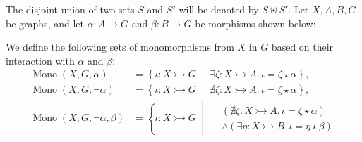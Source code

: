 \begin{notation}
    \label{subgraph_counting:notation:mono_sets}
 The disjoint union of two sets \( S \) and \( S' \) will be denoted by \( S \uplus S' \). Let \( X, A, B, G \) be graphs, and let \( \alpha \mathop{\colon} A \mathop{\to} G \) and \( \beta \mathop{\colon} B \mathop{\to} G \) be morphisms shown below:
\begin{center}
\end{center}
 We define the following sets of monomorphisms from $X$ in $G$ based on their interaction with $\alpha$ and $\beta$:    
    \begin{align*}
        \operatorname{Mono}(X,G,\alpha) &= \left\{ \iota \mathop{\colon} X \rightarrowtail G \;\middle|\; \exists \zeta \mathop{\colon} X \rightarrowtail A.\, \iota \mathop{=} \zeta \mathop{\star} \alpha \right\},
        \\
        \operatorname{Mono}(X,G,\lnot \alpha) &= \left\{ \iota \mathop{\colon} X \rightarrowtail G \;\middle|\; \nexists \zeta \mathop{\colon} X \rightarrowtail A.\, \iota \mathop{=} \zeta \mathop{\star} \alpha \right\},
        \\
        \operatorname{Mono}(X,G,\lnot \alpha, \beta) &= \left\{ 
            \iota \mathop{\colon} X \rightarrowtail G \;\middle|\; 
                \begin{aligned}  
                    &(\nexists \zeta \mathop{\colon} X \rightarrowtail A.\, \iota \mathop{=} \zeta \mathop{\star} \alpha) \\ 
                    &\land (\exists \eta \mathop{\colon} X \rightarrowtail B.\, \iota \mathop{=} \eta \mathop{\star} \beta)

\end{aligned}
\end{align*}
\end{notation}
